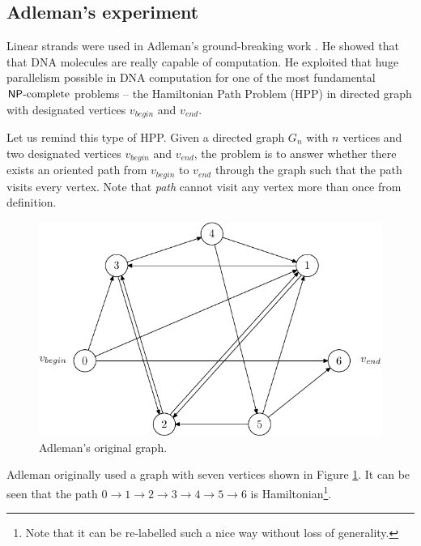 	\subsection{Adleman's experiment}
	\label{sec:adleman}
		
		Linear strands were used in Adleman's ground-breaking work \cite{adleman94}. He showed that that DNA molecules are really capable of computation. He exploited that huge parallelism possible in DNA computation for one of the most fundamental $\mathsf{NP}\textnormal{-complete}$ problems -- the Hamiltonian Path Problem (HPP) in directed graph with designated vertices $v_{begin}$ and $v_{end}$.
		
		Let us remind this type of HPP. Given a directed graph $G_n$ with $n$ vertices and two designated vertices $v_{begin}$ and $v_{end}$, the problem is to answer whether there exists an oriented path from $v_{begin}$ to $v_{end}$ through the graph such that the path visits every vertex. Note that {\em path} cannot visit any vertex more than once from definition.
		
		\begin{figure}[H]
		\begin{center}
			\includegraphics{./figures/adleman_graph.pdf}
			\caption{Adleman's original graph.}
			\label{fig:adleman_graph}
		\end{center}
		\end{figure}
		
		Adleman originally used a graph with seven vertices shown in Figure \ref{fig:adleman_graph}. It can be seen that the path $0 \rightarrow 1 \rightarrow 2 \rightarrow 3 \rightarrow 4 \rightarrow 5 \rightarrow 6$ is Hamiltonian\footnote{Note that it can be re-labelled such a nice way without loss of generality.}.
		
